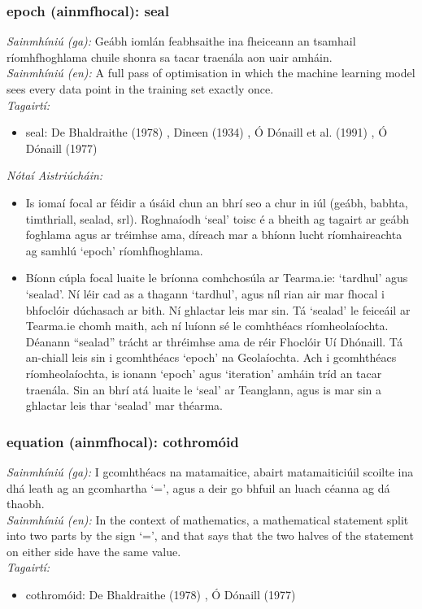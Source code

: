 \subsubsection*{epoch (ainmfhocal): seal}
 \noindent \textit{Sainmhíniú (ga):}  Geábh iomlán feabhsaithe ina fheiceann an tsamhail ríomhfhoghlama chuile shonra sa tacar traenála aon uair amháin.
\\
 \noindent \textit{Sainmhíniú (en):} A full pass of optimisation in which the machine learning model sees every data point in the training set exactly once.
\\
 \noindent \textit{Tagairtí:}
\begin{itemize}
	\item seal: De Bhaldraithe (1978) \cite{de-bhaldraithe}, Dineen (1934) \cite{dineen}, Ó Dónaill et al. (1991) \cite{focloir-beag}, Ó Dónaill (1977) \cite{odonaill}
\end{itemize}

 \noindent \textit{Nótaí Aistriúcháin:}
\begin{itemize}
	\item Is iomaí focal ar féidir a úsáid chun an bhrí seo a chur in iúl (geábh, babhta, timthriall, sealad, srl). Roghnaíodh `seal' toisc é a bheith ag tagairt ar geábh foghlama agus ar tréimhse ama, díreach mar a bhíonn lucht ríomhaireachta ag samhlú `epoch' ríomhfhoghlama.
	\item Bíonn cúpla focal luaite le bríonna comhchosúla ar Tearma.ie: `tardhul' agus `sealad'. Ní léir cad as a thagann `tardhul', agus níl rian air mar fhocal i bhfoclóir dúchasach ar bith. Ní ghlactar leis mar sin. Tá `sealad' le feiceáil ar Tearma.ie chomh maith, ach ní luíonn sé le comhthéacs ríomheolaíochta. Déanann “sealad” trácht ar thréimhse ama de réir Fhoclóir Uí Dhónaill. Tá an-chiall leis sin i gcomhthéacs `epoch' na Geolaíochta. Ach i gcomhthéacs ríomheolaíochta, is ionann `epoch' agus `iteration' amháin tríd an tacar traenála. Sin an bhrí atá luaite le `seal' ar Teanglann, agus is mar sin a ghlactar leis thar `sealad' mar théarma.
\end{itemize}


\subsubsection*{equation (ainmfhocal): cothromóid}
 \noindent \textit{Sainmhíniú (ga):} I gcomhthéacs na matamaitice, abairt matamaiticiúil scoilte ina dhá leath ag an gcomhartha `=', agus a deir go bhfuil an luach céanna ag dá thaobh.
\\
 \noindent \textit{Sainmhíniú (en):} In the context of mathematics, a mathematical statement split into two parts by the sign `=', and that says that the two halves of the statement on either side have the same value.
\\
 \noindent \textit{Tagairtí:}
\begin{itemize}
	\item cothromóid: De Bhaldraithe (1978) \cite{de-bhaldraithe}, Ó Dónaill (1977) \cite{odonaill}
\end{itemize}

